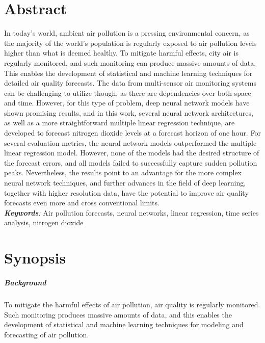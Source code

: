 \documentclass[12pt]{report}
\numberwithin{equation}{section}
\begin{document}


\chapter*{Abstract}
\thispagestyle{empty}
In today's world, ambient air pollution is a pressing environmental concern, as the majority of the world's population is regularly exposed to air pollution levels higher than what is deemed healthy. To mitigate harmful effects, city air is regularly monitored, and such monitoring can produce massive amounts of data. This enables the development of statistical and machine learning techniques for detailed air quality forecasts. The data from multi-sensor air monitoring systems can be challenging to utilize though, as there are dependencies over both space and time. However, for this type of problem, deep neural network models have shown promising results, and in this work, several neural network architectures, as well as a more straightforward multiple linear regression technique, are developed to forecast nitrogen dioxide levels at a forecast horizon of one hour. For several evaluation metrics, the neural network models outperformed the multiple linear regression model. However, none of the models had the desired structure of the forecast errors, and all models failed to successfully capture sudden pollution peaks. Nevertheless, the results point to an advantage for the more complex neural network techniques, and further advances in the field of deep learning, together with higher resolution data, have the potential to improve air quality forecasts even more and cross conventional limits. \\ 

\noindent
\emph{\textbf{Keywords}:} Air pollution forecasts, neural networks, linear regression, time series analysis, nitrogen dioxide

\chapter*{Synopsis}
\thispagestyle{empty}

\paragraph{Background}
To mitigate the harmful effects of air pollution, air quality is regularly monitored. Such monitoring produces massive amounts of data, and this enables the development of statistical and machine learning techniques for modeling and forecasting of air pollution.
\end{document}

